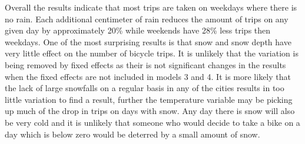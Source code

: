 \documentclass[12pt,letter paper]{article}
\begin{document}
Overall the results indicate that most trips are taken on weekdays where there is no rain.  Each additional centimeter of rain reduces the amount of trips on any given day by approximately 20\% while weekends have 28\% less trips then weekdays.  One of the most surprising results is that snow and snow depth have very little effect on the number of bicycle trips.  It is unlikely that the variation is being removed by fixed effects as their is not significant changes in the results when the fixed effects are not included in models 3 and 4.  It is more likely that the lack of large snowfalls on a regular basis in any of the cities results in too little variation to find a result, further the temperature variable may be picking up much of the drop in trips on days with snow.  Any day there is snow will also be very cold and it is unlikely that someone who would decide to take a bike on a day which is below zero would be deterred by a small amount of snow.  \\
\end{document}
